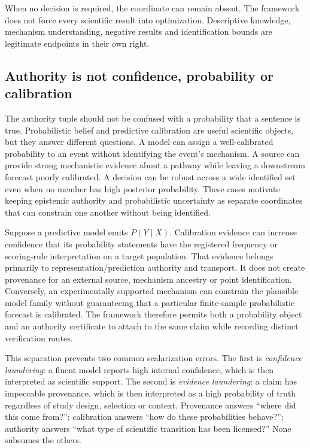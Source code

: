 When no decision is required, the coordinate can remain absent. The framework does not force every scientific result into optimization. Descriptive knowledge, mechanism understanding, negative results and identification bounds are legitimate endpoints in their own right.

\subsection{Authority is not confidence, probability or calibration}

The authority tuple should not be confused with a probability that a sentence is true. Probabilistic belief and predictive calibration are useful scientific objects, but they answer different questions. A model can assign a well-calibrated probability to an event without identifying the event's mechanism. A source can provide strong mechanistic evidence about a pathway while leaving a downstream forecast poorly calibrated. A decision can be robust across a wide identified set even when no member has high posterior probability. These cases motivate keeping epistemic authority and probabilistic uncertainty as separate coordinates that can constrain one another without being identified.

Suppose a predictive model emits \(P(Y\mid X)\). Calibration evidence can increase confidence that its probability statements have the registered frequency or scoring-rule interpretation on a target population. That evidence belongs primarily to representation/prediction authority and transport. It does not create provenance for an external source, mechanism ancestry or point identification. Conversely, an experimentally supported mechanism can constrain the plausible model family without guaranteeing that a particular finite-sample probabilistic forecast is calibrated. The framework therefore permits both a probability object and an authority certificate to attach to the same claim while recording distinct verification routes.

This separation prevents two common scalarization errors. The first is \emph{confidence laundering}: a fluent model reports high internal confidence, which is then interpreted as scientific support. The second is \emph{evidence laundering}: a claim has impeccable provenance, which is then interpreted as a high probability of truth regardless of study design, selection or context. Provenance answers ``where did this come from?''; calibration answers ``how do these probabilities behave?''; authority answers ``what type of scientific transition has been licensed?'' None subsumes the others.

